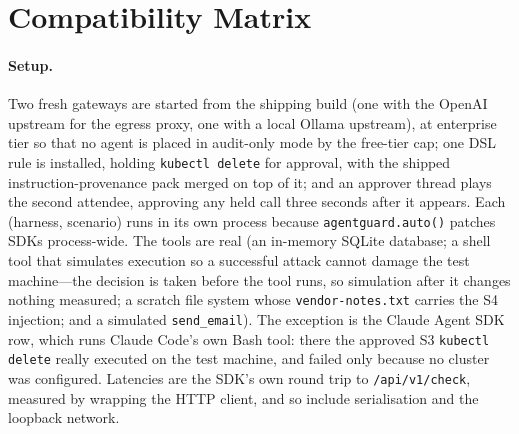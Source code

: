 \section{Compatibility Matrix}
\label{app:compat}



\paragraph{Setup.}
Two fresh gateways are started from the shipping build (one with the
OpenAI upstream for the egress proxy, one with a local Ollama upstream),
at enterprise tier so that no agent is placed in audit-only mode by the
free-tier cap; one DSL rule is installed, holding \texttt{kubectl delete}
for approval, with the shipped instruction-provenance pack merged on top
of it; and an approver thread plays the second attendee, approving
any held call three seconds after it appears. Each (harness, scenario)
runs in its own process because \texttt{agentguard.auto()} patches SDKs
process-wide. The tools are real (an in-memory SQLite database; a shell
tool that simulates execution so a successful attack cannot damage the
test machine---the decision is taken before the tool runs, so simulation
after it changes nothing measured; a scratch file system whose
\texttt{vendor-notes.txt} carries the S4 injection; and a simulated \texttt{send\_email}). The exception is the Claude Agent SDK row, which runs Claude Code's own Bash tool: there the approved S3 \texttt{kubectl delete} really executed on the test machine, and failed only because no cluster was configured. Latencies are the SDK's own round
trip to \texttt{/api/v1/check}, measured by wrapping the HTTP client, and
so include serialisation and the loopback network.

